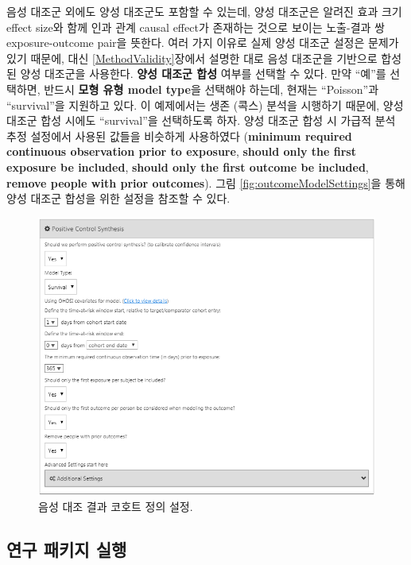 \documentclass[11pt]{book}
\theoremstyle{definition}
\theoremstyle{definition}
\theoremstyle{definition}
\theoremstyle{remark}
\begin{document}
음성 대조군 외에도 양성 대조군도 포함할 수 있는데, 양성 대조군은 알려진
효과 크기 effect size와 함께 인과 관계 causal effect가 존재하는 것으로
보이는 노출-결과 쌍 exposure-outcome pair을 뜻한다. 여러 가지 이유로
실제 양성 대조군 설정은 문제가 있기 때문에, 대신
\ref{MethodValidity}장에서 설명한 대로 음성 대조군을 기반으로 합성된
양성 대조군을 사용한다. \textbf{양성 대조군 합성} 여부를 선택할 수 있다.
만약 ``예''를 선택하면, 반드시 \textbf{모형 유형 model type}을 선택해야
하는데, 현재는 ``Poisson''과 ``survival''을 지원하고 있다. 이 예제에서는
생존 (콕스) 분석을 시행하기 때문에, 양성 대조군 합성 시에도
``survival''을 선택하도록 하자. 양성 대조군 합성 시 가급적 분석 추정
설정에서 사용된 값들을 비슷하게 사용하였다 (\textbf{minimum required
continuous observation prior to exposure}, \textbf{should only the first
exposure be included}, \textbf{should only the first outcome be
included}, \textbf{remove people with prior outcomes}). 그림
\ref{fig:outcomeModelSettings}을 통해 양성 대조군 합성을 위한 설정을
참조할 수 있다.

\begin{figure}

{\centering \includegraphics[width=1\linewidth]{images/PopulationLevelEstimation/pcSynthesis} 

}

\caption{음성 대조 결과 코호트 정의 설정.}\label{fig:pcSynthesis}
\end{figure}

\subsection{연구 패키지 실행}\label{--}
\end{document}
